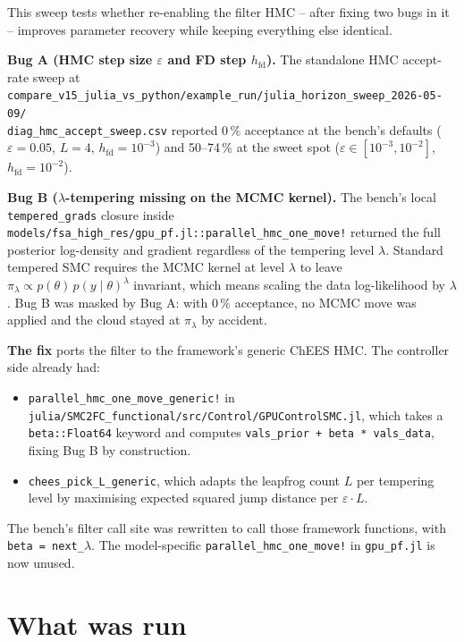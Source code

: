 \documentclass[11pt,a4paper]{article}
\begin{document}
This sweep tests whether re-enabling the filter HMC -- after fixing
two bugs in it -- improves parameter recovery while keeping
everything else identical.

\textbf{Bug A (HMC step size $\varepsilon$ and FD step $h_{\mathrm{fd}}$).}
The standalone HMC accept-rate sweep at\\
\texttt{compare\_v15\_julia\_vs\_python/example\_run/julia\_horizon\_sweep\_2026-05-09/}\\
\texttt{diag\_hmc\_accept\_sweep.csv}
reported 0\,\% acceptance at the bench's defaults
($\varepsilon=0.05$, $L=4$, $h_{\mathrm{fd}}=10^{-3}$) and
50--74\,\% at the sweet spot ($\varepsilon \in [10^{-3}, 10^{-2}]$,
$h_{\mathrm{fd}}=10^{-2}$).

\textbf{Bug B ($\lambda$-tempering missing on the MCMC kernel).} The
bench's local
\texttt{tempered\_grads} closure inside
\texttt{models/fsa\_high\_res/gpu\_pf.jl::parallel\_hmc\_one\_move!}
returned the full posterior log-density and gradient regardless of
the tempering level $\lambda$. Standard tempered SMC requires the
MCMC kernel at level $\lambda$ to leave
$\pi_\lambda \propto p(\theta)\, p(y\mid\theta)^\lambda$ invariant,
which means scaling the data log-likelihood by $\lambda$. Bug B was
masked by Bug A: with 0\,\% acceptance, no MCMC move was applied
and the cloud stayed at $\pi_\lambda$ by accident.

\textbf{The fix} ports the filter to the framework's generic ChEES
HMC. The controller side already had:
\begin{itemize}[itemsep=2pt]
  \item \texttt{parallel\_hmc\_one\_move\_generic!} in
        \texttt{julia/SMC2FC\_functional/src/Control/GPUControlSMC.jl},
        which takes a \texttt{beta::Float64} keyword and computes
        \texttt{vals\_prior + beta * vals\_data}, fixing Bug B by
        construction.
  \item \texttt{chees\_pick\_L\_generic}, which adapts the leapfrog
        count $L$ per tempering level by maximising expected squared
        jump distance per $\varepsilon \cdot L$.
\end{itemize}

The bench's filter call site was rewritten to call those framework
functions, with \texttt{beta = next\_$\lambda$}. The model-specific
\texttt{parallel\_hmc\_one\_move!} in
\texttt{gpu\_pf.jl} is now unused.


\section{What was run}
\label{sec:cli}
\end{document}
